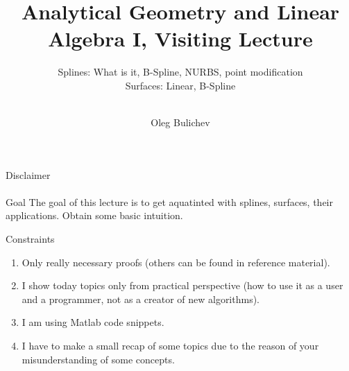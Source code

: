 \documentclass[aspectratio=169]{beamer}
\title[AGLA1]{Analytical Geometry and Linear Algebra I, Visiting Lecture} %
\subtitle{Splines: What is it, B-Spline, NURBS, point modification
\\ Surfaces: Linear, B-Spline  \\ \ 
         } %
\author{Oleg Bulichev}
\newcommand{\fbckg}[1]{\usebackgroundtemplate{\texttt{[image: \#1]}}}%
\begin{document}
\setlength{\abovedisplayskip}{0pt}
\setlength{\belowdisplayskip}{0pt}
\setlength{\abovedisplayshortskip}{0pt}
\setlength{\belowdisplayshortskip}{0pt}

\fbckg{fibeamer/figs/title_page.png}
\note{
    \begin{enumerate}
        \item \ 

    \end{enumerate}
}

\fbckg{fibeamer/figs/common.png}



\begin{frame}[t]{Disclaimer}
\framesubtitle{}
\begin{block}{Goal}
    The goal of this lecture is to get aquatinted with splines, surfaces, their applications. Obtain some basic intuition. 
\end{block}

\begin{alertblock}{Constraints}
    \begin{enumerate}
        \item Only really necessary proofs (others can be found in reference material).
        \item I show today topics only from practical perspective (how to use it as a user and a programmer, not as a creator of new algorithms).
        \item I am using Matlab code snippets.
        \item I have to make a small recap of some topics due to the reason of your misunderstanding of some concepts. 
    \end{enumerate}
\end{alertblock}
\end{frame}
\end{document}
